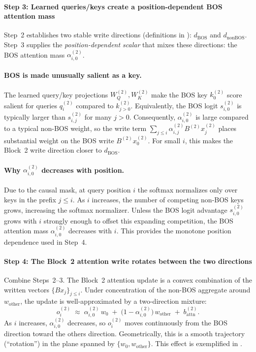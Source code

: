 \documentclass{article}
\theoremstyle{plain}
\theoremstyle{definition}
\theoremstyle{remark}
\begin{document}
\paragraph{Step 3: Learned queries/keys create a position-dependent BOS attention mass}
\label{subsec:mech_step3}

Step~2 establishes two stable write directions (definitions in ): $d_{\text{BOS}}$ and $d_{\text{nonBOS}}$.
Step~3 supplies the \emph{position-dependent scalar} that mixes these directions: the BOS attention mass $\alpha_{i,0}^{(2)}$.

\paragraph{BOS is made unusually salient as a key.}
The learned query/key projections $W_Q^{(2)},W_K^{(2)}$ make the BOS key $k_0^{(2)}$ score salient for queries $q_i^{(2)}$ compared to $k_{j>0}^{(2)}$.
Equivalently, the BOS logit $s_{i,0}^{(2)}$ is typically larger than $s_{i,j}^{(2)}$ for many $j>0$.
Consequently, $\alpha_{i,0}^{(2)}$ is large compared to a typical non-BOS weight, so the write term
$\sum_{j\le i}\alpha_{i,j}^{(2)} B^{(2)}x_j^{(2)}$ places substantial weight on the BOS write $B^{(2)}x_0^{(2)}$.
For small $i$, this makes the Block~2 write direction closer to $d_{\text{BOS}}$.

\paragraph{Why $\alpha_{i,0}^{(2)}$ decreases with position.}
Due to the causal mask, at query position $i$ the softmax normalizes only over keys in the prefix $j\le i$.
As $i$ increases, the number of competing non-BOS keys grows, increasing the softmax normalizer.
Unless the BOS logit advantage $s_{i,0}^{(2)}$ grows with $i$ strongly enough to offset this expanding competition,
the BOS attention mass $\alpha_{i,0}^{(2)}$ decreases with $i$.
This provides the monotone position dependence used in Step~4.

\paragraph{Step 4: The Block~2 attention write rotates between the two directions}
\label{subsec:mech_step4}

Combine Steps~2--3. The Block~2 attention update is a convex combination of the written vectors $\{B x_j\}_{j\le i}$.
Under concentration of the non-BOS aggregate around $w_{\text{other}}$, the update is well-approximated by a two-direction
mixture:
\begin{equation}
o_i^{(2)}
\;\approx\;
\alpha_{i,0}^{(2)}\, w_0
\;+\;
\big(1-\alpha_{i,0}^{(2)}\big)\, w_{\text{other}}
\;+\;
b_{\text{attn}}^{(2)}.
\label{eq:two_dir_mixture_mech}
\end{equation}
As $i$ increases, $\alpha_{i,0}^{(2)}$ decreases, so $o_i^{(2)}$ moves continuously from the BOS direction toward the
others direction. Geometrically, this is a smooth trajectory (``rotation'') in the plane spanned by
$\{w_0,w_{\text{other}}\}$.
This effect is exemplified in .
\end{document}
